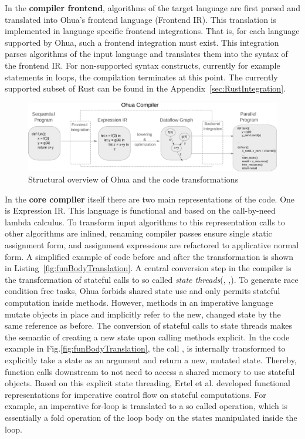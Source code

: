 In the \textbf{compiler frontend}, algorithms of the target language are first parsed and translated into Ohua's frontend language (Frontend IR). This translation is implemented in language specific frontend integrations. That is, for each language supported by Ohua, such a frontend integration must exist. This integration parses algorithms of the input language and translates them into the syntax of the frontend IR. For non-supported syntax constructs, currently for example  statements in loops, the compilation terminates at this point. The currently supported subset of Rust can be found in the Appendix~\ref{sec:RustIntegration}.

\begin{figure}[H]
    \centering
    \includegraphics[scale= 0.36]{figures/ohua_fine_with_channels.png}
    \caption{Structural overview of Ohua and the code transformations}
    \label{fig:ohua_fine}
\end{figure}

In the \textbf{core compiler} itself there are two main representations of the code. One is Expression IR. This language is functional and based on the call-by-need lambda calculus. To transform input algorithms to this representation 
calls to other algorithms are inlined, renaming compiler passes ensure single static assignment form, and assignment expressions are refactored to applicative normal form. A simplified example of code before and after the transformation is shown in Listing~\ref{fig:funBodyTranslation}. A central conversion step in the compiler is the transformation of stateful calls to so called \emph{state threads}(\cite{wadler1992essence}, \cite{launchbury1994lazy},\cite{ertel2019stclang}). To generate race condition free tasks, Ohua forbids shared state use and only permits stateful computation inside methods. However, methods in an imperative language mutate objects in place and implicitly refer to the new, changed state by the same reference as before. The conversion of stateful calls to state threads makes the semantic of creating a new state upon calling methods explicit. In the code example in Fig.\ref{fig:funBodyTranslation}, the call , is internally transformed to explicitly take a state as an argument and return a new, mutated state. Thereby, function calls downstream to not need to access a shared memory to use stateful objects. Based on this explicit state threading, Ertel et al. \cite{ertel2019stclang, ertel2018supporting} developed functional representations for imperative control flow on stateful computations. For example, an imperative for-loop is translated to a so called  operation, which is essentially a fold operation of the loop body on the states manipulated inside the loop. \\

